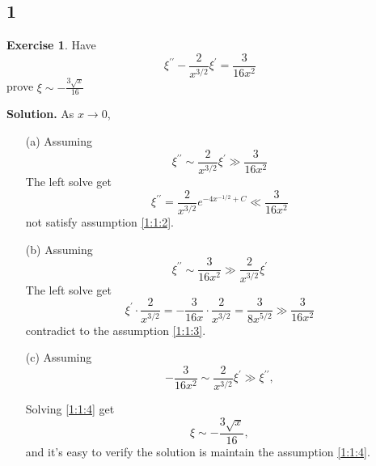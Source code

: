 \documentclass[a4paper]{book}
\newenvironment{solution}%
{\noindent\textbf{Solution.}}%
{\qedhere}
\numberwithin{equation}{chapter}
\theoremstyle{definition}
\newtheorem{exc}[exm]{Exercise}
\begin{document}
\begin{multicols}{2}
\setlength{\columnseprule}{0.2pt}  

\section{1}
%
\begin{exc}
	Have
	\begin{equation} \label{1:1:1}
		\xi^{ \prime \prime} - \frac{2}{x^{3/2}} \xi^ \prime  = \frac{3}{16x^2}
	\end{equation}
	prove $ \xi \sim - \frac{3 \sqrt{x}}{16} $
\end{exc}

\begin{solution}
	As $ x \rightarrow 0$,
	\begin{itemize}
		\item [(a)] Assuming 
		\begin{equation} \label{1:1:2}
			\xi^{\prime \prime} \sim \frac{2}{x^{3/2}} \xi^ \prime \gg \frac{3}{16x^2}
		\end{equation} 
		The left solve get 
		\begin{equation*}
			 \xi^{\prime \prime} = \frac{2}{x^{3/2}} e^{-4x^{-1/2} + C} \ll \frac{3}{16x^2} 
		\end{equation*} 
		not satisfy assumption \ref{1:1:2}.
		
		\item[(b)] Assuming 
		\begin{equation} \label{1:1:3}
				\xi^{\prime \prime} \sim \frac{3}{16x^2} \gg  \frac{2}{x^{3/2}} \xi^ \prime 
		\end{equation}
		The left solve get
		\begin{equation*} 
			\xi^{\prime} \cdot \frac{2}{x^{3/2}} = -\frac{3}{16x} \cdot \frac{2}{x^{3/2}} = \frac{3}{8x^{5/2}} \gg \frac{3}{16x^2}
		\end{equation*}
		contradict to the assumption \ref*{1:1:3}.
		
		\item[(c)] Assuming
		\begin{equation}\label{1:1:4}
			-\frac{3}{16x^2} \sim \frac{2}{x^{3/2}} \xi^ \prime \gg \xi^{\prime \prime},
		\end{equation}
		
		Solving \ref{1:1:4} get
		\begin{equation*}
			\xi \sim - \frac{3 \sqrt{x}}{16},
		\end{equation*}
		and it's easy to verify the solution is maintain the assumption \ref{1:1:4}.
	\end{itemize}
\end{solution}


\end{multicols}
\end{document}
